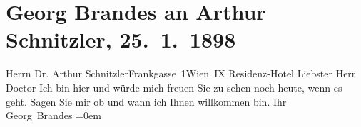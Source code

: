 

         
         \renewcommand{\erwaehntePersonen}{Personen: Georg Brandes}
         \renewcommand{\erwaehnteOrte}{Orte: Frankgasse 1, IX., Alsergrund, Residenzhotel, Wien}
         \renewcommand{\erwaehnteWerke}{}
               \section[Georg Brandes an Arthur Schnitzler, 25. 1. 1898]{ Georg Brandes an Arthur Schnitzler, 25. 1. 1898}\nopagebreak{}\rehead{ }\begin{ledgroupsized}[t]{13cm}\normalsize\beginnumbering \toendnotes[C]{\smallbreak\pagebreak[2]} 
\pstart{}{\pb}Herrn Dr. Arthur Schnitzler\pend{}\pstart{}Frankgasse 1\pend{}\pstart{}Wien IX\pend{}{\bigskip}\pstart
           \noindent{}\centering{}{\pb}Residenz-Hotel\pend
           \pstart{}Liebster Herr Doctor\pend\pstart
           Ich bin hier und würde mich freuen Sie zu sehen noch heute, wenn es geht. Sagen Sie
               mir ob und wann ich Ihnen willkommen bin.\pend
           \pstart
           Ihr{\\[\baselineskip]}\spacefill\mbox{Georg Brandes}\pend
           \leftskip=0em{}
         
         \endnumbering{}\end{ledgroupsized}  \newcommand{\dateiname}{L00766}\newcommand{\titel}{Georg Brandes an Arthur Schnitzler, 25. 1. 1898}\newcommand{\editorInnen}{Martin Anton Müller und Gerd-Hermann Susen}
      